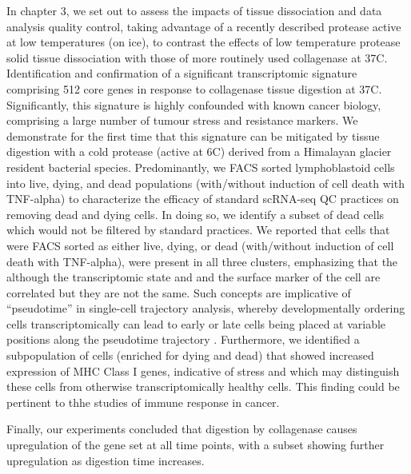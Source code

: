 In chapter 3, we set out to assess the impacts of tissue dissociation and data analysis quality control, taking advantage of a recently described protease active at low temperatures (on ice), to contrast the effects of low temperature protease solid tissue dissociation with those of more routinely used collagenase at 37\textdegree C. Identification and confirmation of a significant transcriptomic signature comprising 512 core genes in response to collagenase tissue digestion at 37\textdegree C. Significantly, this signature is highly confounded with known cancer biology, comprising a large number of tumour stress and resistance markers. We demonstrate for the first time that this signature can be mitigated by tissue digestion with a cold protease (active at 6\textdegree C) derived from a Himalayan glacier resident bacterial species.
Predominantly, we FACS sorted lymphoblastoid cells into live, dying, and dead populations (with/without induction of cell death with TNF-alpha) to characterize the efficacy of standard scRNA-seq QC practices on removing dead and dying cells. In doing so, we identify a subset of dead cells which would not be filtered by standard practices. We reported that cells that were FACS sorted as either live, dying, or dead (with/without induction of cell death with TNF-alpha), were present in all three clusters, emphasizing that the although the transcriptomic state and and the surface marker of the cell are correlated but they are not the same. Such concepts are implicative  of ``pseudotime'' in single-cell trajectory analysis, whereby developmentally ordering cells transcriptomically can lead to early or late cells being placed at variable positions along the pseudotime trajectory \cite{campbell2018descriptive, campbell2018uncovering}. 
 Furthermore, we identified a subpopulation of cells (enriched for dying and dead) that showed increased expression of MHC Class I genes, indicative of stress and which may distinguish these cells from otherwise transcriptomically healthy cells. This finding could be pertinent to thhe studies of immune response in cancer.
 
 Finally, our experiments concluded that digestion by collagenase causes upregulation of the gene set at all time points, with a subset showing further upregulation as digestion time increases.

